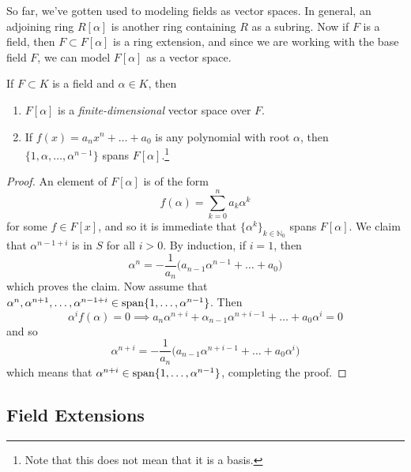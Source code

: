   So far, we've gotten used to modeling fields as vector spaces. In general, an adjoining ring $R[\alpha]$ is another ring containing $R$ as a subring. Now if $F$ is a field, then $F \subset F[\alpha]$ is a ring extension, and since we are working with the base field $F$, we can model $F[\alpha]$ as a vector space. 

  \begin{theorem}
    If $F \subset K$ is a field and $\alpha \in K$, then 
    \begin{enumerate}
      \item $F[\alpha]$ is a \textit{finite-dimensional} vector space over $F$. 
      \item If $f(x) = a_n x^n + \ldots + a_0$ is any polynomial with root $\alpha$, then $\{1, \alpha, \ldots, \alpha^{n-1}\}$ spans $F[\alpha]$.\footnote{Note that this does not mean that it is a basis.} 
    \end{enumerate}
  \end{theorem}
  \begin{proof}
    An element of $F[\alpha]$ is of the form 
    \begin{equation}
      f(\alpha) = \sum_{k=0}^n a_k \alpha^k
    \end{equation} 
    for some $f \in F[x]$, and so it is immediate that $\{\alpha^k\}_{k \in \mathbb{N}_0}$ spans $F[\alpha]$. We claim that $\alpha^{n-1+i}$ is in $S$ for all $i > 0$. By induction, if $i = 1$, then 
    \begin{equation}
      \alpha^n = -\frac{1}{a_n} \big( a_{n-1} \alpha^{n-1} + \ldots + a_0 \big)
    \end{equation}
    which proves the claim. Now assume that $\alpha^n, \alpha^{n+1}, \ldots, \alpha^{n-1+i} \in \Span\{1, \ldots, \alpha^{n-1}\}$. Then 
    \begin{equation}
      \alpha^i f(\alpha) = 0 \implies a_n \alpha^{n+i} + \alpha_{n-1} \alpha^{n+i-1} + \ldots + a_0 \alpha^i = 0 
    \end{equation}
    and so 
    \begin{equation}
      \alpha^{n+i} = -\frac{1}{a_n} \big(a_{n-1} \alpha^{n+i-1} + \ldots + a_0 \alpha^i)
    \end{equation}
    which means that $\alpha^{n+i} \in \Span\{1, \ldots, \alpha^{n-1}\}$, completing the proof. 
  \end{proof} 

\subsection{Field Extensions}

